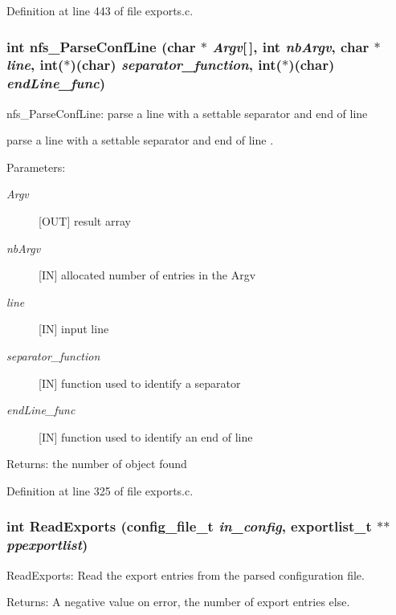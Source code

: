 Definition at line 443 of file exports.c.
\subsubsection{\setlength{\rightskip}{0pt plus 5cm}int nfs\_\-Parse\-Conf\-Line (char $\ast$ {\em Argv}[$\,$], int {\em nb\-Argv}, char $\ast$ {\em line}, int($\ast$)(char) {\em separator\_\-function}, int($\ast$)(char) {\em end\-Line\_\-func})}\label{exports_8c_a67}


nfs\_\-Parse\-Conf\-Line: parse a line with a settable separator and end of line

parse a line with a settable separator and end of line .

\begin{Desc}
\item[Parameters:]
\begin{description}
\item[{\em Argv}][OUT] result array \item[{\em nb\-Argv}][IN] allocated number of entries in the Argv \item[{\em line}][IN] input line \item[{\em separator\_\-function}][IN] function used to identify a separator \item[{\em end\-Line\_\-func}][IN] function used to identify an end of line\end{description}
\end{Desc}
\begin{Desc}
\item[Returns:]the number of object found \end{Desc}


Definition at line 325 of file exports.c.
\subsubsection{\setlength{\rightskip}{0pt plus 5cm}int Read\-Exports (config\_\-file\_\-t {\em in\_\-config}, exportlist\_\-t $\ast$$\ast$ {\em ppexportlist})}\label{exports_8c_a73}


Read\-Exports: Read the export entries from the parsed configuration file. \begin{Desc}
\item[Returns:]A negative value on error, the number of export entries else. \end{Desc}


